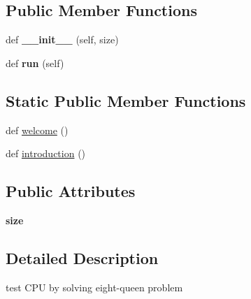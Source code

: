 \subsection*{Public Member Functions}
\begin{DoxyCompactItemize}
\item 
def {\bfseries \+\_\+\+\_\+init\+\_\+\+\_\+} (self, size)\hypertarget{classhal_1_1profile_1_1performance_1_1_eight_queen_test_aff4c0640adbaf044ee1a2f1d20480647}{}\label{classhal_1_1profile_1_1performance_1_1_eight_queen_test_aff4c0640adbaf044ee1a2f1d20480647}

\item 
def {\bfseries run} (self)\hypertarget{classhal_1_1profile_1_1performance_1_1_eight_queen_test_a0f340ce684acbecc0ecec304907852c3}{}\label{classhal_1_1profile_1_1performance_1_1_eight_queen_test_a0f340ce684acbecc0ecec304907852c3}

\end{DoxyCompactItemize}
\subsection*{Static Public Member Functions}
\begin{DoxyCompactItemize}
\item 
def \hyperlink{classhal_1_1profile_1_1performance_1_1_eight_queen_test_a981be709c0e10f0098a8c58af1929746}{welcome} ()
\item 
def \hyperlink{classhal_1_1profile_1_1performance_1_1_eight_queen_test_a570aa1a773c9d24cca31e6a42e852fd4}{introduction} ()
\end{DoxyCompactItemize}
\subsection*{Public Attributes}
\begin{DoxyCompactItemize}
\item 
{\bfseries size}\hypertarget{classhal_1_1profile_1_1performance_1_1_eight_queen_test_afefe08b8ae5a8a787f867d97cc2d6ad4}{}\label{classhal_1_1profile_1_1performance_1_1_eight_queen_test_afefe08b8ae5a8a787f867d97cc2d6ad4}

\end{DoxyCompactItemize}


\subsection{Detailed Description}
\begin{DoxyVerb}test CPU by solving eight-queen problem \end{DoxyVerb}
 

